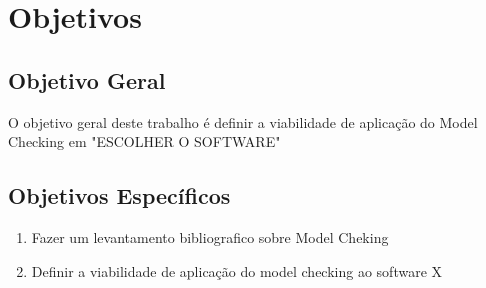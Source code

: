 \section{Objetivos}

\subsection{Objetivo Geral}

O objetivo geral deste trabalho é definir a viabilidade de aplicação do Model Checking em "ESCOLHER O SOFTWARE"


\subsection{Objetivos Específicos}
\begin{enumerate}
    \item Fazer um levantamento bibliografico sobre Model Cheking
    \item Definir a viabilidade de aplicação do model checking ao software X
\end{enumerate}




